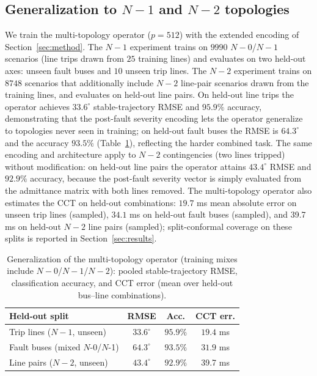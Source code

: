 \documentclass[5p,times]{elsarticle}
\newcommand{\cctNtwo}{39.7}             %
\begin{document}
\subsection{Generalization to $N{-}1$ and $N{-}2$ topologies}
We train the multi-topology operator ($p{=}512$) with the extended encoding of
Section~\ref{sec:method}. The $N{-}1$ experiment trains on $9990$ $N{-}0$/$N{-}1$ scenarios
(line trips drawn from $25$ training lines) and evaluates on two held-out axes: unseen fault
buses and $10$ unseen trip lines. The $N{-}2$ experiment trains on $8748$ scenarios that
additionally include $N{-}2$ line-pair scenarios drawn from the training lines, and evaluates on
held-out line pairs. On held-out line trips the operator
achieves $33.6^\circ$ stable-trajectory RMSE and $95.9\%$ accuracy, demonstrating that the
post-fault severity encoding lets the operator generalize to topologies never seen in training;
on held-out fault buses the RMSE is $64.3^\circ$ and the accuracy $93.5\%$ (Table~\ref{tab:n1}),
reflecting the harder combined task. The same encoding and architecture apply to $N{-}2$ contingencies (two lines tripped)
without modification: on held-out line pairs the operator attains $43.4^\circ$ RMSE and $92.9\%$
accuracy, because the post-fault severity vector is simply evaluated from the admittance matrix
with both lines removed. The multi-topology operator also estimates the CCT on held-out
combinations: $19.7$ ms mean absolute error on unseen trip lines (sampled), $34.1$ ms on held-out fault
buses (sampled), and \cctNtwo{} ms on held-out $N{-}2$ line pairs (sampled); split-conformal coverage on
these splits is reported in Section~\ref{sec:results}.

\begin{table}[t]
\centering
\caption{Generalization of the multi-topology operator (training mixes include $N{-}0$/$N{-}1$/$N{-}2$): pooled
stable-trajectory RMSE, classification accuracy, and CCT error (mean over held-out
bus--line combinations).}
\label{tab:n1}
\begin{tabular}{lccc}
\toprule
Held-out split & RMSE & Acc. & CCT err. \\
\midrule
Trip lines ($N{-}1$, unseen) & $33.6^\circ$ & $95.9\%$ & $19.4$ ms \\
Fault buses (mixed $N$-0/$N$-1) & $64.3^\circ$ & $93.5\%$ & $31.9$ ms \\
Line pairs ($N{-}2$, unseen) & $43.4^\circ$ & $92.9\%$ & \cctNtwo{} ms \\
\bottomrule
\end{tabular}
\end{table}
\end{document}
